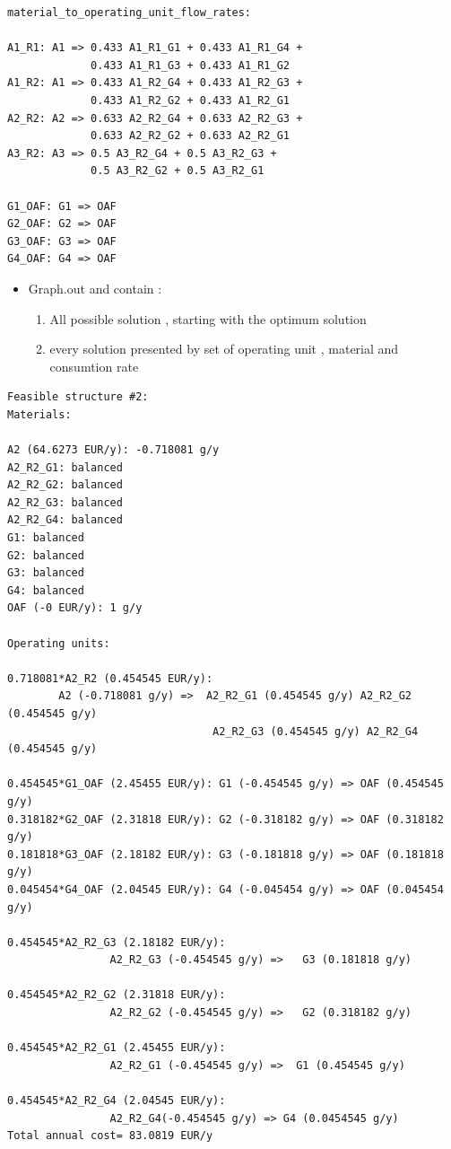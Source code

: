 \begin{lstlisting}[caption=Part from Graph.in]
material_to_operating_unit_flow_rates:

A1_R1: A1 => 0.433 A1_R1_G1 + 0.433 A1_R1_G4 +
			 0.433 A1_R1_G3 + 0.433 A1_R1_G2
A1_R2: A1 => 0.433 A1_R2_G4 + 0.433 A1_R2_G3 + 
			 0.433 A1_R2_G2 + 0.433 A1_R2_G1
A2_R2: A2 => 0.633 A2_R2_G4 + 0.633 A2_R2_G3 + 
			 0.633 A2_R2_G2 + 0.633 A2_R2_G1
A3_R2: A3 => 0.5 A3_R2_G4 + 0.5 A3_R2_G3 + 
			 0.5 A3_R2_G2 + 0.5 A3_R2_G1
			 
G1_OAF: G1 => OAF
G2_OAF: G2 => OAF
G3_OAF: G3 => OAF
G4_OAF: G4 => OAF

\end{lstlisting}



\begin{itemize}
	\item Graph.out and contain :
		\begin{enumerate}
			\item All possible solution , starting with the optimum solution 
			\item every solution presented by set of  operating unit , material and consumtion rate  
 	\end{enumerate}

\end{itemize}



\begin{lstlisting}[caption=Part from Graph.out]
Feasible structure #2:
Materials:

A2 (64.6273 EUR/y): -0.718081 g/y
A2_R2_G1: balanced
A2_R2_G2: balanced
A2_R2_G3: balanced
A2_R2_G4: balanced
G1: balanced
G2: balanced
G3: balanced
G4: balanced
OAF (-0 EUR/y): 1 g/y

Operating units:

0.718081*A2_R2 (0.454545 EUR/y): 
		A2 (-0.718081 g/y) =>  A2_R2_G1 (0.454545 g/y) A2_R2_G2 (0.454545 g/y) 
								A2_R2_G3 (0.454545 g/y) A2_R2_G4 (0.454545 g/y) 
								
0.454545*G1_OAF (2.45455 EUR/y): G1 (-0.454545 g/y) => OAF (0.454545 g/y) 
0.318182*G2_OAF (2.31818 EUR/y): G2 (-0.318182 g/y) => OAF (0.318182 g/y) 
0.181818*G3_OAF (2.18182 EUR/y): G3 (-0.181818 g/y) => OAF (0.181818 g/y) 
0.045454*G4_OAF (2.04545 EUR/y): G4 (-0.045454 g/y) => OAF (0.045454 g/y) 

0.454545*A2_R2_G3 (2.18182 EUR/y): 
				A2_R2_G3 (-0.454545 g/y) =>   G3 (0.181818 g/y) 
				
0.454545*A2_R2_G2 (2.31818 EUR/y):
				A2_R2_G2 (-0.454545 g/y) =>   G2 (0.318182 g/y) 
				
0.454545*A2_R2_G1 (2.45455 EUR/y): 
				A2_R2_G1 (-0.454545 g/y) =>  G1 (0.454545 g/y) 
				
0.454545*A2_R2_G4 (2.04545 EUR/y): 
				A2_R2_G4(-0.454545 g/y) => G4 (0.0454545 g/y) 
Total annual cost= 83.0819 EUR/y


\end{lstlisting}



